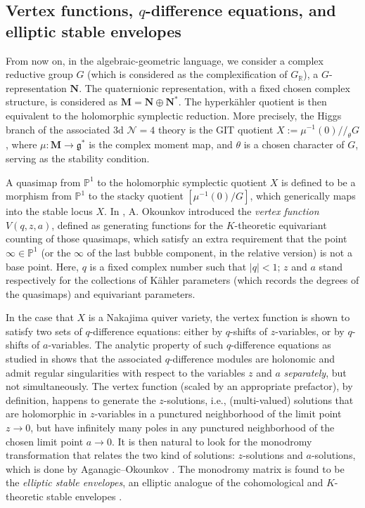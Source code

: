 \documentclass[10pt]{amsart}
\theoremstyle{definition}
\def\RR{{\mathbb{R}}}
\def\PP{{\mathbb{P}}}
\newcommand{\cN}{\mathcal{N}}
\theoremstyle{definition}
\numberwithin{equation}{section}
\theoremstyle{Theorem}
\begin{document}
\subsection{Vertex functions, $q$-difference equations, and elliptic stable envelopes}

From now on, in the algebraic-geometric language, we consider a complex reductive group $G$ (which is considered as the complexification of $G_\RR$), a $G$-representation $\mathbf{N}$. The quaternionic representation, with a fixed chosen complex structure, is considered as  $\mathbf{M} = \mathbf{N} \oplus \mathbf{N}^*$. The hyperk\"ahler quotient is then equivalent to the holomorphic symplectic reduction. More precisely, the Higgs branch of the associated 3d $\cN = 4$ theory is the GIT quotient $X := \mu^{-1} (0) /\!/_\theta G$, where $\mu: \mathbf{M} \to \mathfrak{g}^*$ is the complex moment map, and $\theta$ is a chosen character of $G$, serving as the stability condition.

A quasimap from $\PP^1$ to the holomorphic symplectic quotient $X$ is defined to be a morphism from $\PP^1$ to the stacky quotient $[\mu^{-1} (0) / G]$, which generically maps into the stable locus $X$. In \cite{Oko}, A. Okounkov introduced the \emph{vertex function} $V(q, z, a)$, defined as generating functions for the $K$-theoretic equivariant counting of those quasimaps, which satisfy an extra requirement that the point $\infty \in \PP^1$ (or the $\infty$ of the last bubble component, in the relative version) is not a base point. Here, $q$ is a fixed complex number such that $|q|<1$; $z$ and $a$ stand respectively for the collections of K\"ahler parameters (which records the degrees of the quasimaps) and equivariant parameters.

In the case that $X$ is a Nakajima quiver variety, the vertex function is shown to satisfy two sets of $q$-difference equations: either by $q$-shifts of $z$-variables, or by $q$-shifts of $a$-variables. The analytic property of such $q$-difference equations as studied in \cite{Oko, OS} shows that the associated $q$-difference modules are holonomic and admit regular singularities with respect to the variables $z$ and $a$ \emph{separately}, but not simultaneously. The vertex function (scaled by an appropriate prefactor), by definition, happens to generate the $z$-solutions, i.e., (multi-valued) solutions that are holomorphic in $z$-variables in a punctured neighborhood of the limit point $z\to 0$, but have infinitely many poles in any punctured neighborhood of the chosen limit point $a\to 0$. It is then natural to look for the monodromy transformation that relates the two kind of solutions: $z$-solutions and $a$-solutions, which is done by Aganagic--Okounkov \cite{AOelliptic}. The monodromy matrix is found to be the \emph{elliptic stable envelopes}, an elliptic analogue of the cohomological and $K$-theoretic stable envelopes \cite{MO}.
\end{document}
